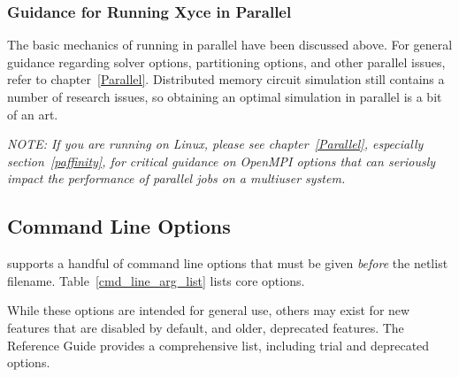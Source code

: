 \subsubsection{Guidance for Running Xyce in Parallel}

The basic mechanics of running \Xyce{} in parallel have been discussed above.
For general guidance regarding solver options, partitioning options, and
other parallel issues, refer to chapter~\ref{Parallel}.
Distributed memory circuit simulation still contains a number of research
issues, so obtaining an optimal simulation in parallel is a bit of an art. 

\emph{NOTE:  If you are running on Linux, please see chapter~\ref{Parallel}, especially section~\ref{paffinity}, for critical guidance on OpenMPI options that can seriously impact the performance of parallel jobs on a multiuser system.}

\subsection{Command Line Options}
\label{cmd_line_args}

\Xyce{} supports a handful of command line options that must be given
{\em before} the netlist filename. Table~\ref{cmd_line_arg_list} lists \Xyce{} core options.


While these options are intended for general use, others may exist for new
features that are disabled by default, and older, deprecated features.  The
\Xyce{} Reference Guide\ReferenceGuide{} provides a comprehensive list, including trial and
deprecated options.



